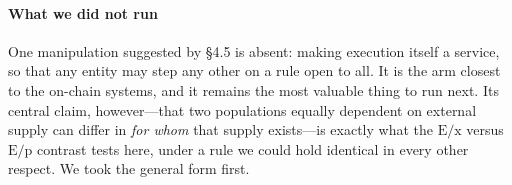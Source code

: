 \paragraph{What we did not run}
One manipulation suggested by \S4.5 is absent: making execution itself a
service, so that any entity may step any other on a rule open to all. It is the
arm closest to the on-chain systems, and it remains the most valuable thing to
run next. Its central claim, however---that two populations equally dependent
on external supply can differ in \emph{for whom} that supply exists---is
exactly what the $\mathrm{E/x}$ versus $\mathrm{E/p}$ contrast tests here,
under a rule we could hold identical in every other respect. We took the
general form first.
